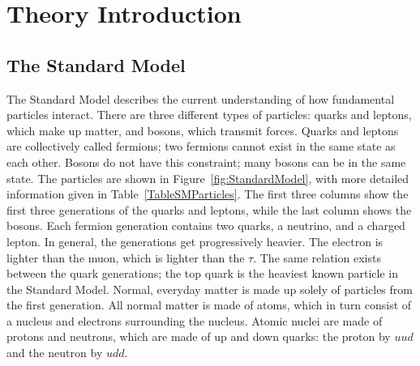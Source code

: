 \chapter{Theory Introduction}  %
\label{theory}

\section{The Standard Model}
\label{theory:SM}




The Standard Model describes the current understanding 
of how fundamental particles interact.  
There are three different types of particles: 
quarks and leptons, 
which make up matter, 
and bosons, which transmit forces.  
Quarks and leptons are collectively called fermions; 
two fermions cannot exist in the same state as each other.  
Bosons do not have this constraint; 
many bosons can be in the same state.  
The particles are shown in Figure~\ref{fig:StandardModel}, 
with more detailed information given in 
Table~\ref{TableSMParticles}. 
The first three columns show the first three generations 
of the quarks and leptons, 
while the last column shows the bosons.  
Each fermion generation contains two quarks, 
a neutrino, and a charged lepton.  
In general, the generations get progressively heavier.  
The electron is lighter than the muon, 
which is lighter than the $\tau$.   
The same relation exists between the quark generations; 
the top quark is the heaviest known particle in the Standard Model.  %
Normal, everyday matter is made up solely of particles 
from the first generation.  
All normal matter is made of atoms, 
which in turn consist of a nucleus and 
electrons surrounding the nucleus.  
Atomic nuclei are made of protons and neutrons, 
which are made of up and down quarks: 
the proton by $uud$ and the neutron by $udd$.  


